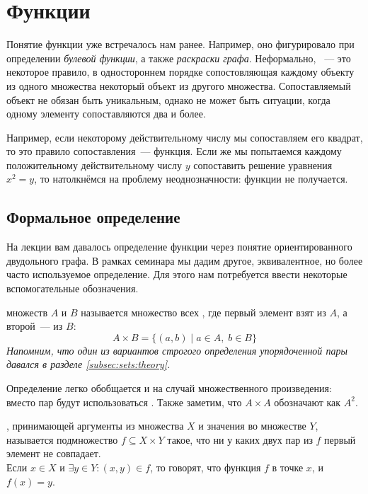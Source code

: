 \section{Функции}
\label{sec:functions}

Понятие функции уже встречалось нам ранее.
Например, оно фигурировало при определении \textit{булевой функции}, а также \textit{раскраски графа}.
Неформально, ~--- это некоторое правило, в одностороннем порядке сопостовляющая каждому объекту из одного множества некоторый объект из другого множества.
Сопоставляемый объект не обязан быть уникальным, однако не может быть ситуации, когда одному элементу сопоставляются два и более.

Например, если некоторому действительному числу мы сопоставляем его квадрат, то это правило сопоставления~--- функция.
Если же мы попытаемся каждому положительному действительному числу $ y $ сопоставить решение уравнения $ x^2 = y $, то натолкнёмся на проблему неоднозначности:
функции не получается.

\subsection{Формальное определение}
\label{subsec:functions:definition}

На лекции вам давалось определение функции через понятие ориентированного двудольного графа.
В рамках семинара мы дадим другое, эквивалентное, но более часто используемое определение.
Для этого нам потребуется ввести некоторые вспомогательные обозначения.

\begin{definition}
     множеств $ A $ и $ B $ называется множество всех , где первый элемент взят из $ A $, а второй~--- из $ B $:
    \[
        A \times B = \{ (a, b) \mid a \in A, \; b \in B \}
    \]
    \textit{Напомним, что один из вариантов строгого определения упорядоченной пары давался в разделе \ref{subsec:sets:theory}.}
\end{definition}

Определение легко обобщается и на случай множественного произведения: вместо пар будут использоваться .
Также заметим, что $ A \times A $ обозначают как $ A^2 $.

\begin{definition}
    \label{definition:functions:function}
    , принимающей аргументы из множества $ X $ и значения во множестве $ Y $,
    называется подмножество $ f \subseteq X \times Y $ такое, что ни у каких двух пар из $ f $ первый элемент не совпадает.
    \\[0.25\baselineskip]
    Если $ x \in X $ и $ \exists y \in Y: (x, y) \in f $, то говорят, что функция $ f $  в точке $ x $, и $ f(x) = y $.
\end{definition}

